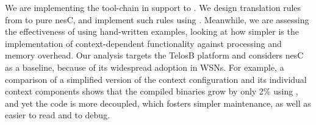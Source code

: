 We are implementing the tool-chain in support to \conesc. We design
translation rules from \conesc to pure nesC, and implement such rules
using {}. Meanwhile, we are assessing the
effectiveness of \conesc using hand-written examples, looking at how
simpler is the implementation of context-dependent functionality
against processing and memory overhead. Our analysis targets the
TelosB platform and considers nesC as a baseline, because of its
widespread adoption in WSNs. For example, a comparison of a simplified
version of the {} context configuration and its
individual context components shows that the compiled binaries
grow by only 2\% using \conesc, and yet the code is more decoupled,
which fosters simpler maintenance, as well as easier to
read and to debug.







